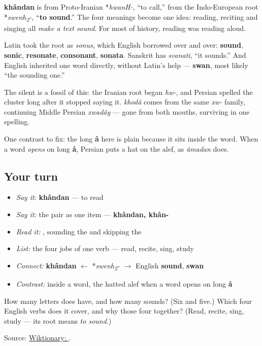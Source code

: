 \begin{cousinweb}
\textbf{khândan} is from Proto-Iranian *\emph{hwanH-}, “to call,” from the Indo-European root *\emph{swenh\textsubscript{2}-}, “\textbf{to sound}.” The four meanings become one idea: reading, reciting and singing all \emph{make a text sound}. For most of history, reading was reading aloud.

Latin took the root as \emph{sonus}, which English borrowed over and over: \textbf{sound}, \textbf{sonic}, \textbf{resonate}, \textbf{consonant}, \textbf{sonata}. Sanskrit has \emph{svanati}, “it sounds.” And English inherited one word directly, without Latin's help — \textbf{swan}, most likely “the sounding one.”

The silent \textbf{} is a fossil of this: the Iranian root began \emph{hw-}, and Persian spelled the cluster long after it stopped saying it. \textbf{} \emph{khodâ} comes from the same \emph{xw-} family, continuing Middle Persian \emph{xwadây} — gone from both mouths, surviving in one spelling.

One contrast to fix: the long \textbf{â} here is plain \textbf{} because it sits inside the word. When a word \emph{opens} on long \textbf{â}, Persian puts a hat on the alef, as \emph{âmadan} does.
\end{cousinweb}

\subsection*{Your turn}
\begin{itemize}
\raggedright
  \item \emph{Say it:} \textbf{khândan} — to read
  \item \emph{Say it:} the pair as one item — \textbf{khândan, khân-}
  \item \emph{Read it:} \textbf{}, sounding the \textbf{} and skipping the \textbf{}
  \item \emph{List:} the four jobs of one verb — read, recite, sing, study
  \item \emph{Connect:} \textbf{khândan} $\leftarrow$ *\emph{swenh\textsubscript{2}-} $\to$ English \textbf{sound}, \textbf{swan}
  \item \emph{Contrast:} \textbf{} inside a word, the hatted alef when a word opens on long \textbf{â}
\end{itemize}

\begin{tcolorbox}[breakable,colback=teal!4,colframe=teal!35!black,title={Before you move on}]
How many letters does \textbf{} have, and how many sounds? (Six and five.) Which four English verbs does it cover, and why those four together? (Read, recite, sing, study — its root means \emph{to sound}.)

Source: \href{https://en.wiktionary.org/wiki/\%D8\%AE\%D9\%88\%D8\%A7\%D9\%86\%D8\%AF\%D9\%86}{Wiktionary: }.
\end{tcolorbox}
